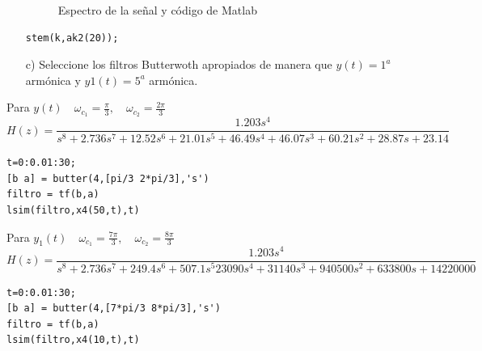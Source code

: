 \documentclass[a4paper,12pt]{article}
\begin{document}
\begin{itemize}
\begin{multicols}{2}
\begin{figure}[H]
\begin{center}
            \caption{Espectro de la señal y código de Matlab}
            \label{fig:ak2}
        \end{center}
    \end{figure}
    \columnbreak
    
    \begin{lstlisting}
stem(k,ak2(20));
    \end{lstlisting}
\end{multicols}
    \item[c)] Seleccione los filtros Butterwoth apropiados de manera que $y(t)= 1^a$ armónica y $y1(t) = 5^a$ armónica. \\
    \end{itemize}
    Para $y(t) \quad \omega_{c_1} = \frac{\pi}{3}, \quad \omega_{c_2} = \frac{2\pi}{3}$ \\  
    \[ H(z) = \frac{1.203s^4}{s^8 + 2.736s^7 + 12.52s^6 + 21.01s^5 + 46.49s^4 +46.07s^3 + 60.21s^2 +28.87s +23.14} \]
    \begin{lstlisting}
t=0:0.01:30;
[b a] = butter(4,[pi/3 2*pi/3],'s')
filtro = tf(b,a)
lsim(filtro,x4(50,t),t)
    \end{lstlisting}
    Para $y_1(t) \quad \omega_{c_1} = \frac{7\pi}{3}, \quad \omega_{c_2} = \frac{8\pi}{3}$
    \[ H(z) =  \frac{1.203s^4}{s^8 +2.736s^7 + 249.4s^6 + 507.1s^5 23090s^4 + 31140s^3 + 940500s^2 +633800s + 14220000} \]
    \begin{lstlisting}
t=0:0.01:30;
[b a] = butter(4,[7*pi/3 8*pi/3],'s')
filtro = tf(b,a)
lsim(filtro,x4(10,t),t)
    \end{lstlisting}
\end{document}
